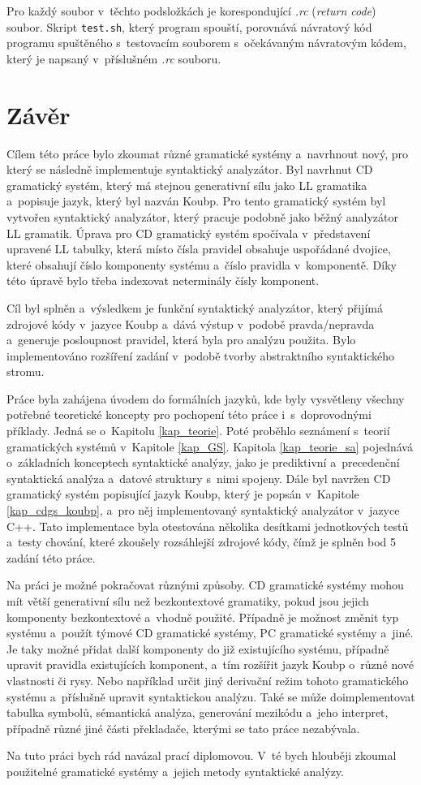 Pro každý soubor v~těchto podsložkách je korespondující \emph{.rc} (\emph{return code}) soubor.
Skript \texttt{test.sh}, který program spouští, porovnává návratový kód programu spuštěného s~testovacím souborem s~očekávaným návratovým kódem, který je napsaný v~příslušném \emph{.rc} souboru.

\chapter{Závěr}
Cílem této práce bylo zkoumat různé gramatické systémy a~navrhnout nový, pro který se následně implementuje syntaktický analyzátor.
Byl navrhnut CD gramatický systém, který má stejnou generativní sílu jako LL gramatika a~popisuje jazyk, který byl nazván Koubp.
Pro tento gramatický systém byl vytvořen syntaktický analyzátor, který pracuje podobně jako běžný analyzátor LL gramatik.
Úprava pro CD gramatický systém spočívala v~představení upravené LL tabulky, která místo čísla pravidel obsahuje uspořádané dvojice, které obsahují číslo komponenty systému a~číslo pravidla v~komponentě.
Díky této úpravě bylo třeba indexovat neterminály čísly komponent.

Cíl byl splněn a~výsledkem je funkční syntaktický analyzátor, který přijímá zdrojové kódy v~jazyce Koubp a~dává výstup v~podobě pravda/nepravda a~generuje posloupnost pravidel, která byla pro analýzu použita.
Bylo implementováno rozšíření zadání v~podobě tvorby abstraktního syntaktického stromu.

Práce byla zahájena úvodem do formálních jazyků, kde byly vysvětleny všechny potřebné teoretické koncepty pro pochopení této práce i~s~doprovodnými příklady.
Jedná se o~Kapitolu \ref{kap_teorie}.
Poté proběhlo seznámení s~teorií gramatických systémů v~Kapitole \ref{kap_GS}.
Kapitola \ref{kap_teorie_sa} pojednává o~základních konceptech syntaktické analýzy, jako je prediktivní a~precedenční syntaktická analýza a~datové struktury s~nimi spojeny.
Dále byl navržen CD gramatický systém popisující jazyk Koubp, který je popsán v~Kapitole \ref{kap_cdgs_koubp}, a~pro něj implementovaný syntaktický analyzátor v~jazyce C++.
Tato implementace byla otestována několika desítkami jednotkových testů a~testy chování, které zkoušely rozsáhlejší zdrojové kódy, čímž je splněn bod 5 zadání této práce.

Na práci je možné pokračovat různými způsoby.
CD gramatické systémy mohou mít větší generativní sílu než bezkontextové gramatiky, pokud jsou jejich komponenty bezkontextové a~vhodně použité.
Případně je možnost změnit typ systému a~použít týmové CD gramatické systémy, PC gramatické systémy a~jiné.
Je taky možné přidat další komponenty do již existujícího systému, případně upravit pravidla existujících komponent, a~tím rozšířit jazyk Koubp o~různé nové vlastnosti či rysy.
Nebo například určit jiný derivační režim tohoto gramatického systému a~příslušně upravit syntaktickou analýzu.
Také se může doimplementovat tabulka symbolů, sémantická analýza, generování mezikódu a~jeho interpret, případně různé jiné části překladače, kterými se tato práce nezabývala.

Na tuto práci bych rád navázal prací diplomovou.
V~té bych hlouběji zkoumal použitelné gramatické systémy a~jejich metody syntaktické analýzy.